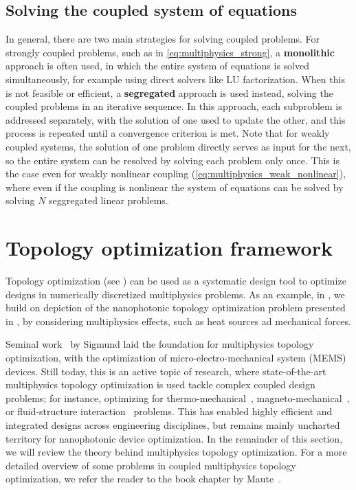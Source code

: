     \subsection{Solving the coupled system of equations}

    In general, there are two main strategies for solving coupled problems. For strongly coupled problems, 
    such as in \eqref{eq:multiphysics_strong}, a \textbf{monolithic} approach is often used, in which the entire system of 
    equations is solved simultaneously, for example using direct solvers like LU factorization. When this is not feasible or 
    efficient, a \textbf{segregated} approach is used instead, solving the coupled problems in an iterative sequence. In this 
    approach, each subproblem is addressed separately, with the solution of one used to update the other, and this process 
    is repeated until a convergence criterion is met. Note that for weakly coupled systems, the solution of one problem directly 
    serves as input for the next, so the entire system can be resolved by solving each problem only once. This is the case even for 
    weakly nonlinear coupling (\eqref{eq:multiphysics_weak_nonlinear}), where even if the coupling is nonlinear the system of equations
    can be solved by solving $N$ seggregated linear problems.
    
    \section{Topology optimization framework}\label{sec:topopt_theory}
    Topology optimization (see ) can be used as a systematic design tool to optimize designs in numerically discretized multiphysics problems. 
    As an example, in , we build on depiction of the nanophotonic topology optimization problem presented in , by considering
    multiphysics effects, such as heat sources ad mechanical forces.

    Seminal work~\cite{MEMS_multi} by Sigmund laid the foundation for multiphysics topology optimization, with the optimization of micro-electro-mechanical system (MEMS) devices. 
    Still today, this is an active topic of research, where state-of-the-art multiphysics topology optimization is used tackle complex coupled  design problems; for instance, optimizing for thermo-mechanical~\cite{third_thermal}, magneto-mechanical~\cite{magneto}, or fluid-structure interaction~\cite{fsint} problems. 
    This has enabled highly efficient and integrated designs across engineering disciplines, but remains mainly uncharted territory for nanophotonic device optimization. In the remainder of this section, we will review the theory behind multiphysics topology optimization. For a more detailed overview of some problems in coupled multiphysics
    topology optimization, we refer the reader to the book chapter by Maute~\cite{coupled_topopt}.


